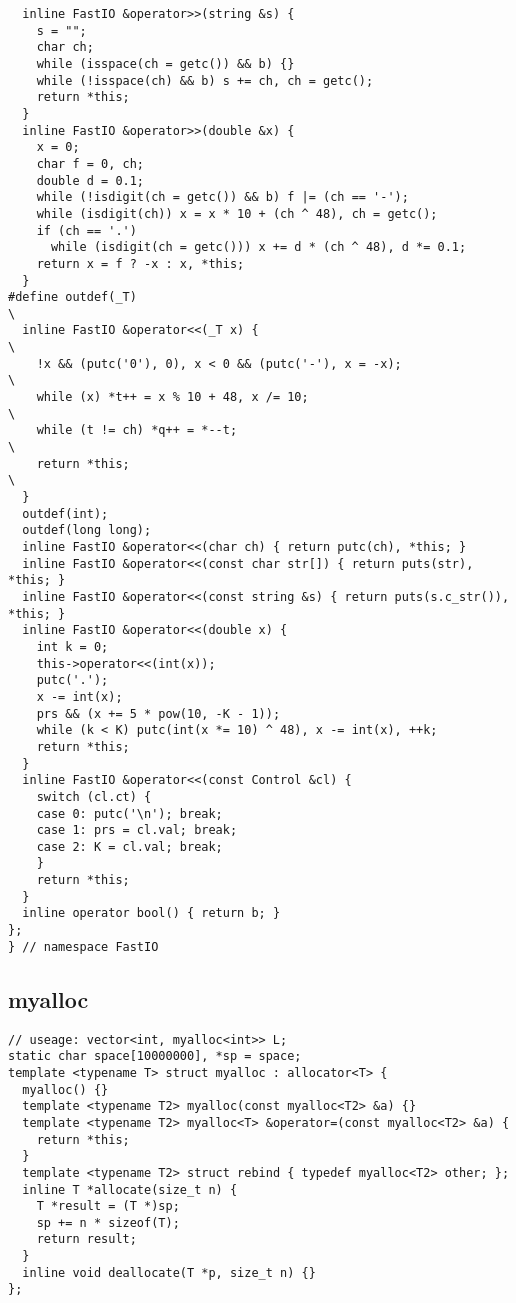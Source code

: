 \documentclass[twoside]{article}
\begin{document}
\begin{lstlisting}
  inline FastIO &operator>>(string &s) {
    s = "";
    char ch;
    while (isspace(ch = getc()) && b) {}
    while (!isspace(ch) && b) s += ch, ch = getc();
    return *this;
  }
  inline FastIO &operator>>(double &x) {
    x = 0;
    char f = 0, ch;
    double d = 0.1;
    while (!isdigit(ch = getc()) && b) f |= (ch == '-');
    while (isdigit(ch)) x = x * 10 + (ch ^ 48), ch = getc();
    if (ch == '.')
      while (isdigit(ch = getc())) x += d * (ch ^ 48), d *= 0.1;
    return x = f ? -x : x, *this;
  }
#define outdef(_T)                                                             \
  inline FastIO &operator<<(_T x) {                                            \
    !x && (putc('0'), 0), x < 0 && (putc('-'), x = -x);                        \
    while (x) *t++ = x % 10 + 48, x /= 10;                                     \
    while (t != ch) *q++ = *--t;                                               \
    return *this;                                                              \
  }
  outdef(int);
  outdef(long long);
  inline FastIO &operator<<(char ch) { return putc(ch), *this; }
  inline FastIO &operator<<(const char str[]) { return puts(str), *this; }
  inline FastIO &operator<<(const string &s) { return puts(s.c_str()), *this; }
  inline FastIO &operator<<(double x) {
    int k = 0;
    this->operator<<(int(x));
    putc('.');
    x -= int(x);
    prs && (x += 5 * pow(10, -K - 1));
    while (k < K) putc(int(x *= 10) ^ 48), x -= int(x), ++k;
    return *this;
  }
  inline FastIO &operator<<(const Control &cl) {
    switch (cl.ct) {
    case 0: putc('\n'); break;
    case 1: prs = cl.val; break;
    case 2: K = cl.val; break;
    }
    return *this;
  }
  inline operator bool() { return b; }
};
} // namespace FastIO

\end{lstlisting}
\subsection{myalloc}
\begin{lstlisting}
// useage: vector<int, myalloc<int>> L;
static char space[10000000], *sp = space;
template <typename T> struct myalloc : allocator<T> {
  myalloc() {}
  template <typename T2> myalloc(const myalloc<T2> &a) {}
  template <typename T2> myalloc<T> &operator=(const myalloc<T2> &a) {
    return *this;
  }
  template <typename T2> struct rebind { typedef myalloc<T2> other; };
  inline T *allocate(size_t n) {
    T *result = (T *)sp;
    sp += n * sizeof(T);
    return result;
  }
  inline void deallocate(T *p, size_t n) {}
};

\end{lstlisting}
\end{document}
